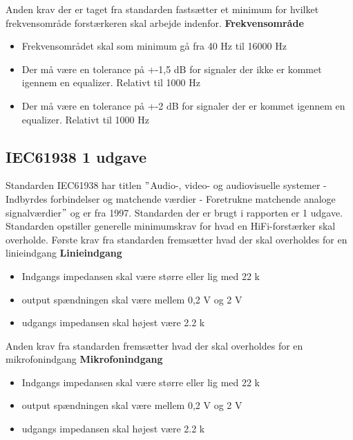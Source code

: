 Anden krav der er taget fra standarden fastsætter et minimum for hvilket frekvensområde forstærkeren skal arbejde indenfor.
\newline 
\newline
\textbf{Frekvensområde}
\begin{itemize}
\item Frekvensområdet skal som minimum gå fra 40 Hz til 16000 Hz
\item Der må være en tolerance på +-1,5 dB for signaler der ikke er kommet igennem en equalizer. Relativt til 1000 Hz
\item Der må være en tolerance på +-2 dB for signaler der er kommet igennem en equalizer. Relativt til 1000 Hz
\end{itemize}


\subsection*{IEC61938 1 udgave}
\label{IEC61938}
Standarden IEC61938 har titlen $"$Audio-, video- og audiovisuelle systemer - Indbyrdes forbindelser og matchende værdier - Foretrukne matchende analoge signalværdier$"$ og er fra 1997. Standarden der er brugt i rapporten er 1 udgave. Standarden opstiller generelle minimumskrav for hvad en HiFi-forstærker skal overholde. \cite{IEC61938}%
\newline
\newline
Første krav fra standarden fremsætter hvad der skal overholdes for en linieindgang
\newline
\newline
\textbf{Linieindgang}
\begin{itemize}
\item Indgangs impedansen skal være større eller lig med 22 k\ohm
\item output spændningen skal være mellem 0,2 V og 2 V
\item udgangs impedansen skal højest være 2.2 k\ohm
\end{itemize}
Anden krav fra standarden fremsætter hvad der skal overholdes for en mikrofonindgang
\newline 
\newline
\textbf{Mikrofonindgang}
\begin{itemize}
\item Indgangs impedansen skal være større eller lig med 22 k\ohm
\item output spændningen skal være mellem 0,2 V og 2 V
\item udgangs impedansen skal højest være 2.2 k\ohm
\end{itemize}

